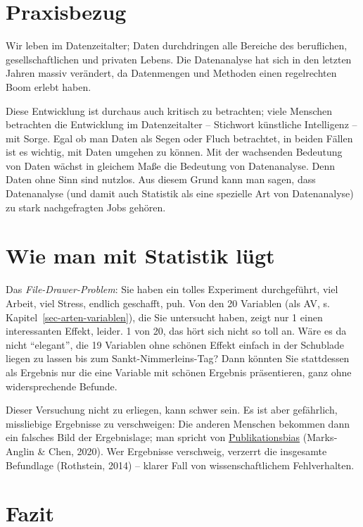 \documentclass[
  a4paper,
]{scrbook}
\theoremstyle{definition}
\theoremstyle{definition}
\theoremstyle{definition}
\theoremstyle{remark}
\begin{document}
\section{Praxisbezug}\label{praxisbezug}

Wir leben im Datenzeitalter; Daten durchdringen alle Bereiche des
beruflichen, gesellschaftlichen und privaten Lebens. Die Datenanalyse
hat sich in den letzten Jahren massiv verändert, da Datenmengen und
Methoden einen regelrechten Boom erlebt haben.

Diese Entwicklung ist durchaus auch kritisch zu betrachten; viele
Menschen betrachten die Entwicklung im Datenzeitalter -- Stichwort
künstliche Intelligenz -- mit Sorge. Egal ob man Daten als Segen oder
Fluch betrachtet, in beiden Fällen ist es wichtig, mit Daten umgehen zu
können. Mit der wachsenden Bedeutung von Daten wächst in gleichem Maße
die Bedeutung von Datenanalyse. Denn Daten ohne Sinn sind nutzlos. Aus
diesem Grund kann man sagen, dass Datenanalyse (und damit auch Statistik
als eine spezielle Art von Datenanalyse) zu stark nachgefragten Jobs
gehören.

\section{Wie man mit Statistik
lügt}\label{wie-man-mit-statistik-luxfcgt}

Das \emph{File-Drawer-Problem}: Sie haben ein tolles Experiment
durchgeführt, viel Arbeit, viel Stress, endlich geschafft, puh. Von den
20 Variablen (als AV, s. Kapitel~\ref{sec-arten-variablen}), die Sie
untersucht haben, zeigt nur 1 einen interessanten Effekt, leider. 1 von
20, das hört sich nicht so toll an. Wäre es da nicht ``elegant'', die 19
Variablen ohne schönen Effekt einfach in der Schublade liegen zu lassen
bis zum Sankt-Nimmerleins-Tag? Dann könnten Sie stattdessen als Ergebnis
nur die eine Variable mit schönen Ergebnis präsentieren, ganz ohne
widersprechende Befunde.

Dieser Versuchung nicht zu erliegen, kann schwer sein. Es ist aber
gefährlich, missliebige Ergebnisse zu verschweigen: Die anderen Menschen
bekommen dann ein falsches Bild der Ergebnislage; man spricht von
\href{https://de.wikipedia.org/wiki/Publikationsbias}{Publikationsbias}
(Marks‐Anglin \& Chen, 2020). Wer Ergebnisse verschweig, verzerrt die
insgesamte Befundlage (Rothstein, 2014) -- klarer Fall von
wissenschaftlichem Fehlverhalten.

\section{Fazit}\label{fazit-2}
\end{document}
